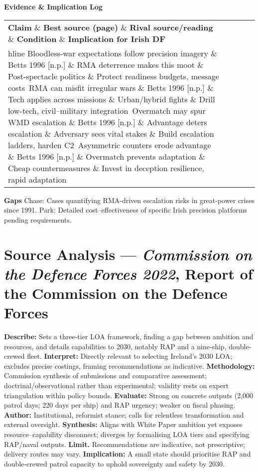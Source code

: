 \textbf{Evidence \& Implication Log}
\begin{tabular}{p{3.2cm}p{4.2cm}p{3.6cm}p{3.2cm}p{4.2cm}}
	\textbf{Claim} \& \textbf{Best source (page)} \& \textbf{Rival source/reading} \& \textbf{Condition} \& \textbf{Implication for Irish DF}\\hline
	Bloodless-war expectations follow precision imagery \& Betts 1996 [n.p.] \& RMA deterrence makes this moot \& Post-spectacle politics \& Protect readiness budgets, message costs\
	RMA can misfit irregular wars \& Betts 1996 [n.p.] \& Tech applies across missions \& Urban/hybrid fights \& Drill low-tech, civil–military integration\
	Overmatch may spur WMD escalation \& Betts 1996 [n.p.] \& Advantage deters escalation \& Adversary sees vital stakes \& Build escalation ladders, harden C2\
	Asymmetric counters erode advantage \& Betts 1996 [n.p.] \& Overmatch prevents adaptation \& Cheap countermeasures \& Invest in deception resilience, rapid adaptation\
\end{tabular}

\textbf{Gaps}
Chase: Cases quantifying RMA-driven escalation risks in great-power crises since 1991.
Park: Detailed cost–effectiveness of specific Irish precision platforms pending requirements.


\parencite{CODF_2022}

\section*{Source Analysis — \textit{Commission on the Defence Forces 2022}, Report of the Commission on the Defence Forces}
\textbf{Describe:} Sets a three‐tier LOA framework, finding a gap between ambition and resources, and details capabilities to 2030, notably RAP and a nine‐ship, double‐crewed fleet.
\textbf{Interpret:} Directly relevant to selecting Ireland’s 2030 LOA; excludes precise costings, framing recommendations as indicative.
\textbf{Methodology:} Commission synthesis of submissions and comparative assessment; doctrinal/observational rather than experimental; validity rests on expert triangulation within policy bounds.
\textbf{Evaluate:} Strong on concrete outputs (2,000 patrol days; 220 days per ship) and RAP urgency; weaker on fiscal phasing.
\textbf{Author:} Institutional, reformist stance; calls for relentless transformation and external oversight.
\textbf{Synthesis:} Aligns with White Paper ambition yet exposes resource–capability disconnect; diverges by formalising LOA tiers and specifying RAP/naval outputs.
\textbf{Limit.} Recommendations are indicative, not prescriptive; delivery routes may vary.
\textbf{Implication:} A small state should prioritise RAP and double‐crewed patrol capacity to uphold sovereignty and safety by 2030.

